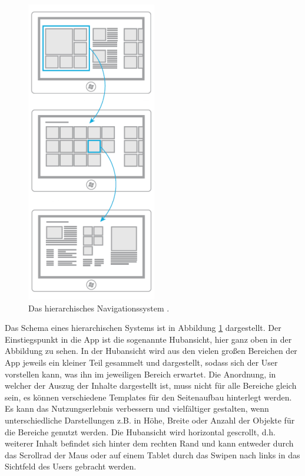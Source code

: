 \documentclass[12pt,a4paper,bibtotoc,abstracton]{scrartcl}
\begin{document}
\begin{figure}[h]	
	\centering
	\includegraphics[scale=1]{Bilder/Abbildungen/ms_navigation_hierarchie} 
	\caption[Das flache Navigationssystem]{Das hierarchisches Navigationssystem \protect\citep{MicrosoftNavidesign2013}.}
	\label{fig:navihierarchisch}
\end{figure}

Das Schema eines hierarchischen Systems ist in Abbildung \ref{fig:navihierarchisch} dargestellt. Der Einstiegspunkt in die App ist die sogenannte \glqq Hubansicht\grqq, hier ganz oben in der Abbildung zu sehen. In der Hubansicht wird aus den vielen großen Bereichen der App jeweils ein kleiner Teil gesammelt und dargestellt, sodass sich der User vorstellen kann, was ihn im jeweiligen Bereich erwartet. Die Anordnung, in welcher der Auszug der Inhalte dargestellt ist, muss nicht für alle Bereiche gleich sein, es können verschiedene Templates für den Seitenaufbau hinterlegt werden. Es kann das Nutzungserlebnis verbessern und vielfältiger gestalten, wenn unterschiedliche Darstellungen z.B. in Höhe, Breite oder Anzahl der Objekte für die Bereiche genutzt werden. Die Hubansicht wird horizontal gescrollt, d.h. weiterer Inhalt befindet sich hinter dem rechten Rand und kann entweder durch das Scrollrad der Maus oder auf einem Tablet durch das Swipen nach links in das Sichtfeld des Users gebracht werden.
\end{document}
